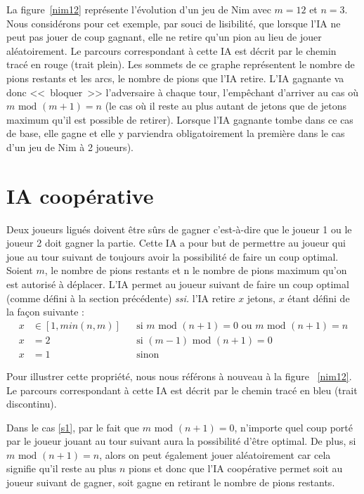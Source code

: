 \documentclass[10pt,a4paper]{article}
\newcommand{\ssi}{\textit{ssi. }}
\renewcommand{\mod}{\text{ mod }}
\begin{document}
La figure~\ref{nim12} représente l'évolution d'un jeu de Nim avec $m=12$ et
$n=3$. Nous considérons pour cet exemple, par souci de lisibilité, que lorsque
l'IA ne peut pas jouer de coup gagnant, elle ne retire qu'un pion au lieu de
jouer aléatoirement. Le parcours correspondant à cette IA est décrit par le
chemin tracé en {\color{red} rouge} (trait plein).
Les sommets de ce graphe représentent le
nombre de pions restants et les arcs, le nombre de pions que l'IA retire.
L'IA gagnante va donc <<~bloquer~>> l'adversaire à chaque tour, l'empêchant
d'arriver au cas où $m \mod (m+1) = n$ (le cas où il reste au plus autant de
jetons que de jetons maximum qu'il est possible de retirer). Lorsque l'IA
gagnante tombe dans ce cas de base, elle gagne et elle y parviendra
obligatoirement la première dans le cas d'un jeu de Nim à 2 joueurs).

\section{IA coopérative}
Deux joueurs ligués doivent être sûrs de gagner c'est-à-dire que le joueur 1 ou
le joueur 2 doit gagner la partie. Cette IA a pour but de permettre au joueur
qui joue au tour suivant de toujours avoir la possibilité de faire un coup
optimal. Soient $m$, le nombre de pions restants et n le nombre de pions maximum
qu'on est autorisé à déplacer. L'IA permet au joueur suivant de faire un coup
optimal (comme défini à la section précédente) \ssi l'IA retire $x$
jetons, $x$ étant défini de la façon suivante :
\begin{align}
	x &\in [1, min(n, m)] &&
	\text{si } m \mod (n+1) = 0 \text{ ou } m \mod (n+1) = n \label{s1} \\
	x &= 2 && \text{si } (m-1) \mod (n+1) = 0 \label{s2} \\
	x &= 1 && \text{sinon} \label{s3}
\end{align}

Pour illustrer cette propriété, nous nous référons à nouveau à la figure
~\ref{nim12}. Le parcours correspondant à cette IA est décrit par le chemin
tracé en {\color{blue} bleu} (trait discontinu).

Dans le cas \eqref{s1}, par le fait que
$m \mod (n+1)=0$, n'importe quel coup porté par le joueur jouant au tour
suivant aura la possibilité d'être optimal. De plus, si $m \mod (n+1) = n$, alors
on peut également jouer aléatoirement car cela signifie qu'il reste au plus $n$
pions et donc que l'IA coopérative permet soit au joueur suivant de gagner, soit
gagne en retirant le nombre de pions restants.
\end{document}
